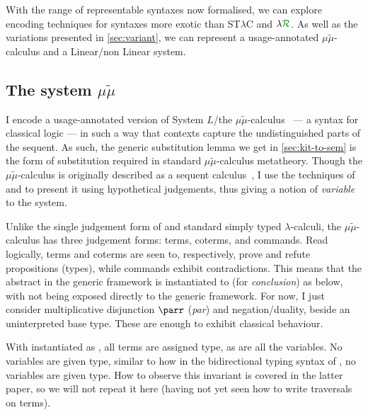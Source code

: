 With the range of representable syntaxes now formalised, we can explore encoding
techniques for syntaxes more exotic than ST$\lambda$C and $\name$.
As well as the variations presented in \cref{sec:variant}, we can represent a
usage-annotated $\mu\tilde\mu$-calculus and a Linear/non Linear system.

\subsection{The system $\mu\tilde\mu$}
I encode a usage-annotated version of System $L$/the
$\mu\tilde\mu$-calculus~\citep{CH00} --- a syntax for classical logic --- in
such a way that contexts capture the undistinguished parts of the sequent.
As such, the generic substitution lemma we get in \cref{sec:kit-to-sem} is the
form of substitution required in standard $\mu\tilde\mu$-calculus metatheory.
Though the $\mu\tilde\mu$-calculus is originally described as a sequent
calculus~\citep{CH00}, I use the techniques of
\citet[p.~12]{herbelin-hab} and \citet{LC06} to present it using hypothetical
judgements, thus giving a notion of \emph{variable} to the system.

Unlike the single judgement form of \name{} and standard simply typed
$\lambda$-calculi, the $\mu\tilde\mu$-calculus has three judgement forms:
terms, coterms, and commands.
Read logically, terms and coterms are seen to, respectively, prove and refute
propositions (types), while commands exhibit contradictions.
This means that the abstract  in the generic framework is
instantiated to  (for \emph{conclusion}) as below, with
 not being exposed directly to the generic framework.
For now, I just consider multiplicative disjunction $\parr$ (\emph{par}) and
negation/duality, beside an uninterpreted base type.
These are enough to exhibit classical behaviour.

\noindent
\begin{minipage}[t]{0.5\textwidth}
\end{minipage}
\begin{minipage}[t]{0.5\textwidth}
\end{minipage}

With  instantiated as , all terms are assigned
 type, as are all the variables.
No variables are given  type, similar to how in
the bidirectional typing syntax of \citet[p.~25]{AACMM21}, no variables are
given  type.
How to observe this invariant is covered in the latter paper, so we will not
repeat it here (having not yet seen how to write traversals on terms).


